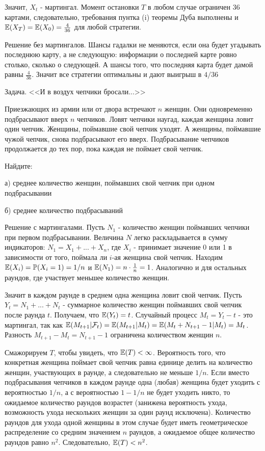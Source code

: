 {Значит, $X_{t}$ - мартингал. Момент остановки $T$ в любом случае ограничен 36 картами, следовательно, требования пунтка (i) теоремы Дуба выполнены и $\mathbb{E}(X_{T})=\mathbb{E}(X_{0})=\frac{4}{36}$ для любой стратегии.

Решение без мартингалов. Шансы гадалки не меняются, если она будет угадывать последнюю карту, а не следующую: информации о последней карте ровно столько, сколько о следующей. А шансы того, что последняя карта будет дамой равны $\frac{4}{36}$.
Значит все стратегии оптимальны и дают выигрыш в $4/36$

Задача. <<И в воздух чепчики бросали...>> %

Приезжающих из армии или от двора встречают $n$ женщин. Они
одновременно подбрасывают вверх $n$ чепчиков. Ловят чепчики
наугад, каждая женщина ловит один чепчик.
Женщины, поймавшие свой чепчик уходят. А женщины,
поймавшие чужой чепчик, снова подбрасывают его вверх.
Подбрасывание чепчиков продолжается до тех пор, пока каждая не
поймает свой чепчик.

Найдите:

а) среднее количество женщин, поймавших свой чепчик при одном подбрасывании

б) среднее количество подбрасываний

Решение с мартингалами. Пусть $N_{1}$ - количество женщин поймавших чепчики при первом подбрасывании. Величина $N$ легко раскладывается в сумму индикаторов: $N_{1}=X_{1}+...+X_{n}$, где $X_{i}$ - принимает значение 0 или 1 в зависимости от того, поймала ли $i$-ая женщина свой чепчик. Находим $\mathbb{E}(X_{i})=\mathbb{P}(X_{i}=1)=1/n$ и $\mathbb{E}(N_{1})=n\cdot \frac{1}{n}=1$. Аналогично и для остальных раундов, где участвует меньшее количество женщин.

Значит в каждом раунде в среднем одна женщина ловит свой чепчик. Пусть $Y_{t}=N_{1}+...+N_{t}$ - суммарное количество женщин поймавших свой чепчик после раунда $t$. Получаем, что $\mathbb{E}(Y_{t})=t$. Случайный процесс $M_{t}=Y_{t}-t$ - это мартингал, так как $\mathbb{E}(M_{t+1}|\mathcal{F}_{t})=\mathbb{E}(M_{t+1}|M_{t})=\mathbb{E}(M_{t}+N_{t+1}-1|M_{t})=M_{t}$. Разность $M_{t+1}-M_{t}=N_{t+1}-1$ ограничена количеством женщин $n$.

Смажорируем $T$, чтобы увидеть, что $\mathbb{E}(T)<\infty$. Вероятность того, что конкретная женщина поймает свой чепчик равна единице делить на количество женщин, участвующих в раунде, а следовательно не меньше $1/n$. Если вместо подбрасывания чепчиков в каждом раунде одна (любая) женщина будет уходить с вероятностью $1/n$, а с вероятностью $1-1/n$ не будет уходить никто, то ожидаемое количество раундов возрастет (занижена вероятность ухода, возможность ухода нескольких женщин за один раунд исключена). Количество раундов для ухода одной женщины в этом случае будет иметь геометрическое распределение со средним значением $n$ раундов, а ожидаемое общее количество раундов равно $n^{2}$. Следовательно, $\mathbb{E}(T)<n^{2}$.

}
